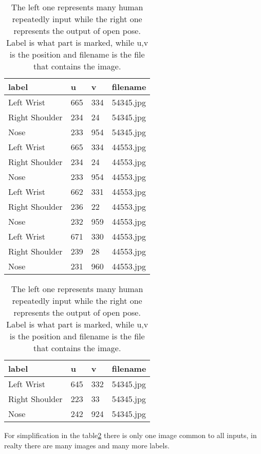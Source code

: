 \begin{table}[h]
    \centering
    \begin{tabular}{|llll|}
        label & u & v & filename\\
        \hline
        Left Wrist      & 665 & 334     & 54345.jpg \\
        Right Shoulder  & 234 & 24      & 54345.jpg \\
        Nose            & 233 & 954     & 54345.jpg \\
        Left Wrist      & 665 & 334     & 44553.jpg \\
        Right Shoulder  & 234 & 24      & 44553.jpg \\
        Nose            & 233 & 954     & 44553.jpg \\

        Left Wrist      & 662 & 331     & 44553.jpg \\
        Right Shoulder  & 236 & 22      & 44553.jpg \\
        Nose            & 232 & 959     & 44553.jpg \\
        Left Wrist      & 671 & 330     & 44553.jpg \\
        Right Shoulder  & 239 & 28      & 44553.jpg \\
        Nose            & 231 & 960     & 44553.jpg
    \end{tabular}
    \begin{tabular}{|llll|}
        label & u & v & filename\\
        \hline
        Left Wrist      & 645 & 332     & 54345.jpg \\
        Right Shoulder  & 223 & 33      & 54345.jpg \\
        Nose            & 242 & 924     & 54345.jpg \\
    \end{tabular}
    \caption{The left one represents many human repeatedly input while the right one represents the output of open pose. Label is what part is marked, while u,v is the position and filename is the file that contains the image.}
    \label{tab:impl:input}
\end{table}
For simplification in the table\ref{tab:impl:input} there is only one image common to all inputs, in realty there are many images and many more labels.
\par

